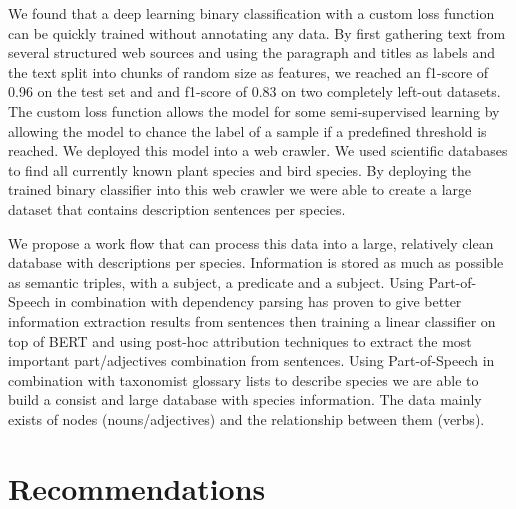 \documentclass[a4paper, 12pt, oneside]{book} %
\begin{document}
We found that a deep learning binary classification with a custom loss function can be quickly trained without annotating any data.
By first gathering text from several structured web sources and using the paragraph and titles as labels and the text split into chunks of random size as features, we reached an f1-score of 0.96 on the test set and and f1-score of 0.83 on two completely left-out datasets.
The custom loss function allows the model for some semi-supervised learning by allowing the model to chance the label of a sample if a predefined threshold is reached.
We deployed this model into a web crawler.
We used scientific databases to find all currently known plant species and bird species.
By deploying the trained binary classifier into this web crawler we were able to create a large dataset that contains description sentences per species.

We propose a work flow that can process this data into a large, relatively clean database with descriptions per species.
Information is stored as much as possible as semantic triples, with a subject, a predicate and a subject.
Using Part-of-Speech in combination with dependency parsing has proven to give better information extraction results from sentences then training a linear classifier on top of BERT and using post-hoc attribution techniques to extract the most important part/adjectives combination from sentences.
Using Part-of-Speech in combination with taxonomist glossary lists to describe species we are able to build a consist and large database with species information.
The data mainly exists of nodes (nouns/adjectives) and the relationship between them (verbs).


\newpage
\section{Recommendations}
\end{document}
